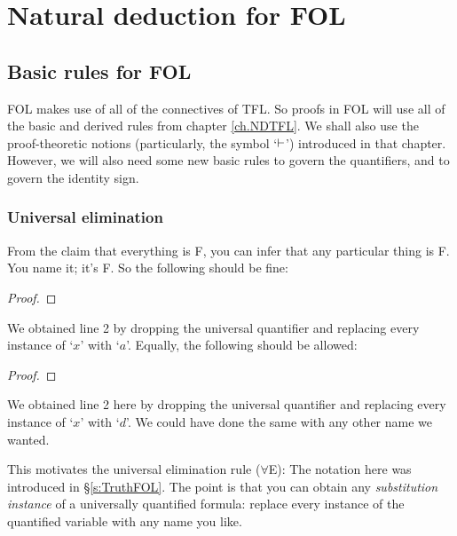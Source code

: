 \part{Natural deduction for FOL}
\label{ch.NDFOL}

\chapter{Basic rules for FOL}\label{s:BasicFOL}

FOL makes use of all of the connectives of TFL. So proofs in FOL will use all of the basic and derived rules from chapter \ref{ch.NDTFL}. We shall also use the proof-theoretic notions (particularly, the symbol `$\vdash$') introduced in that chapter. However, we will also need some new basic rules to govern the quantifiers, and to govern the identity sign.


\section{Universal elimination}

From the claim that everything is F, you can infer that any particular thing is F. You name it; it's F. So the following should be fine:
\begin{proof}
	 
\end{proof}
We obtained line 2 by dropping the universal quantifier and replacing every instance of `$x$' with `$a$'. Equally, the following should be allowed:
\begin{proof}
	 
\end{proof}
We obtained line 2 here by dropping the universal quantifier and replacing every instance of `$x$' with `$d$'. We could have done the same with any other name we wanted. 

This motivates the universal elimination rule ($\forall$E):
The notation here was introduced in \S\ref{s:TruthFOL}. The point is that you can obtain any \emph{substitution instance} of a universally quantified formula: replace every instance of the quantified variable with any name you like. 

